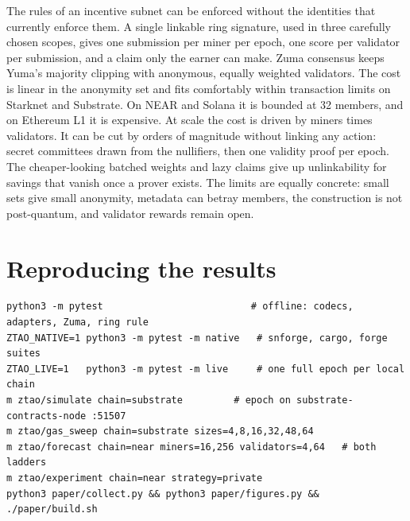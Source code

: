 \documentclass[11pt]{article}
\theoremstyle{remark}
\begin{document}
The rules of an incentive subnet can be enforced without the identities that currently enforce them. A single linkable ring signature, used in three carefully chosen scopes, gives one submission per miner per epoch, one score per validator per submission, and a claim only the earner can make. Zuma consensus keeps Yuma's majority clipping with anonymous, equally weighted validators. The cost is linear in the anonymity set and fits comfortably within transaction limits on Starknet and Substrate. On NEAR and Solana it is bounded at 32 members, and on Ethereum L1 it is expensive. At scale the cost is driven by miners times validators. It can be cut by orders of magnitude without linking any action: secret committees drawn from the nullifiers, then one validity proof per epoch. The cheaper-looking batched weights and lazy claims give up unlinkability for savings that vanish once a prover exists. The limits are equally concrete: small sets give small anonymity, metadata can betray members, the construction is not post-quantum, and validator rewards remain open.

\appendix
\section{Reproducing the results}\label{app:repro}
\begin{small}
\begin{verbatim}
python3 -m pytest                          # offline: codecs, adapters, Zuma, ring rule
ZTAO_NATIVE=1 python3 -m pytest -m native   # snforge, cargo, forge suites
ZTAO_LIVE=1   python3 -m pytest -m live     # one full epoch per local chain
m ztao/simulate chain=substrate         # epoch on substrate-contracts-node :51507
m ztao/gas_sweep chain=substrate sizes=4,8,16,32,48,64
m ztao/forecast chain=near miners=16,256 validators=4,64   # both ladders
m ztao/experiment chain=near strategy=private
python3 paper/collect.py && python3 paper/figures.py && ./paper/build.sh
\end{verbatim}
\end{small}



\end{document}
